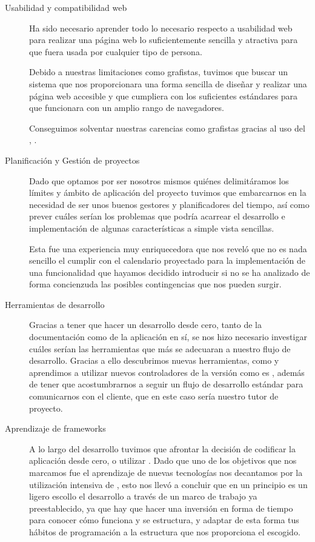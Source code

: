 \begin{description}
\item [Usabilidad y compatibilidad web] Ha sido necesario aprender todo lo
  necesario respecto a usabilidad web para realizar una página web lo
  suficientemente sencilla y atractiva para que fuera usada por cualquier tipo
  de persona.

  Debido a nuestras limitaciones como grafistas, tuvimos que buscar un sistema
  que nos proporcionara una forma sencilla de diseñar y realizar una página web
  accesible y que cumpliera con los suficientes estándares para que funcionara
  con un amplio rango de navegadores.

  Conseguimos solventar nuestras carencias como grafistas gracias al uso del
  , .
\item [Planificación y Gestión de proyectos] Dado que optamos por ser nosotros
  mismos quiénes delimitáramos los límites y ámbito de aplicación del proyecto
  tuvimos que embarcarnos en la necesidad de ser unos buenos gestores y
  planificadores del tiempo, así como prever cuáles serían los problemas que
  podría acarrear el desarrollo e implementación de algunas características a
  simple vista sencillas.

  Esta fue una experiencia muy enriquecedora que nos reveló que no es nada
  sencillo el cumplir con el calendario proyectado para la implementación de una
  funcionalidad que hayamos decidido introducir si no se ha analizado de forma
  concienzuda las posibles contingencias que nos pueden surgir.
\item [Herramientas de desarrollo] Gracias a tener que hacer un desarrollo desde
  cero, tanto de la documentación como de la aplicación en sí, se nos hizo
  necesario investigar cuáles serían las herramientas que más se adecuaran a
  nuestro flujo de desarrollo. Gracias a ello descubrimos nuevas herramientas,
  como  y aprendimos a utilizar nuevos controladores de la
  versión como es , además de tener que acostumbrarnos a seguir un
  flujo de desarrollo estándar para comunicarnos con el cliente, que en este
  caso sería nuestro tutor de proyecto.
\item [Aprendizaje de frameworks] A lo largo del desarrollo tuvimos que afrontar
  la decisión de codificar la aplicación desde cero, o utilizar
  . Dado que uno de los objetivos que nos marcamos fue el
  aprendizaje de nuevas tecnologías nos decantamos por la utilización intensiva
  de , esto nos llevó a concluir que en un principio es un
  ligero escollo el desarrollo a través de un marco de trabajo ya
  preestablecido, ya que hay que hacer una inversión en forma de tiempo para
  conocer cómo funciona y se estructura, y adaptar de esta forma tus hábitos de
  programación a la estructura que nos proporciona el 
  escogido.
\end{description}

